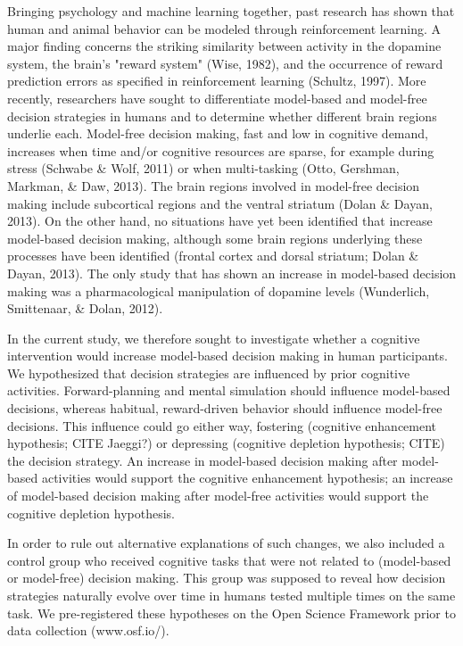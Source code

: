 \documentclass[11pt]{article} %
\begin{document}
Bringing psychology and machine learning together, past research has shown that human and animal behavior can be modeled through reinforcement learning. A major finding concerns the striking similarity between activity in the dopamine system, the brain's "reward system" (Wise, 1982), and the occurrence of reward prediction errors as specified in reinforcement learning (Schultz, 1997). More recently, researchers have sought to differentiate model-based and model-free decision strategies in humans and to determine whether different brain regions underlie each. Model-free decision making, fast and low in cognitive demand, increases when time and/or cognitive resources are sparse, for example during stress (Schwabe \& Wolf, 2011) or when multi-tasking (Otto, Gershman, Markman, \& Daw, 2013). The brain regions involved in model-free decision making include subcortical regions and the ventral striatum (Dolan \& Dayan, 2013). On the other hand, no situations have yet been identified that increase model-based decision making, although some brain regions underlying these processes have been identified (frontal cortex and dorsal striatum; Dolan \& Dayan, 2013). The only study that has shown an increase in model-based decision making was a pharmacological manipulation of dopamine levels (Wunderlich, Smittenaar, \& Dolan, 2012). 

In the current study, we therefore sought to investigate whether a cognitive intervention would increase model-based decision making in human participants. We hypothesized that decision strategies are influenced by prior cognitive activities. Forward-planning and mental simulation should influence model-based decisions, whereas habitual, reward-driven behavior should influence model-free decisions. This influence could go either way, fostering (cognitive enhancement hypothesis; CITE Jaeggi?) or depressing (cognitive depletion hypothesis; CITE) the decision strategy. An increase in model-based decision making after model-based activities would support the cognitive enhancement hypothesis; an increase of model-based decision making after model-free activities would support the cognitive depletion hypothesis.

In order to rule out alternative explanations of such changes, we also included a control group who received cognitive tasks that were not related to (model-based or model-free) decision making. This group was supposed to reveal how decision strategies naturally evolve over time in humans tested multiple times on the same task. We pre-registered these hypotheses on the Open Science Framework prior to data collection (www.osf.io/).
\end{document}
